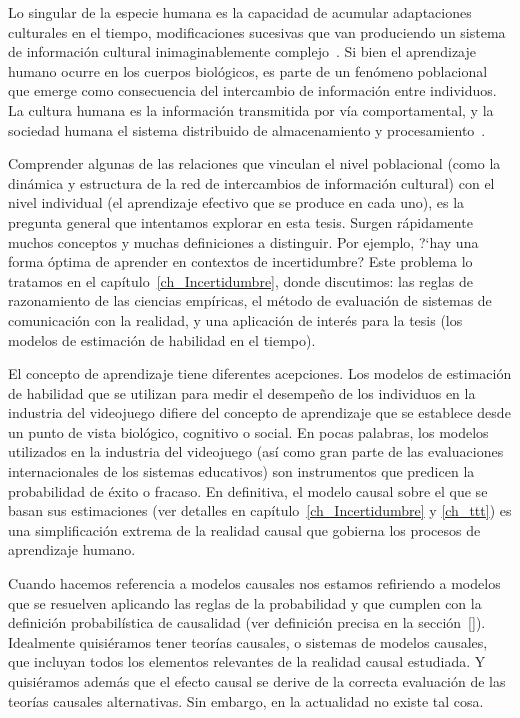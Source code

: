 \documentclass[a4paper,11pt]{book}
\theoremstyle{definition}
\begin{document}

Lo singular de la especie humana es la capacidad de acumular adaptaciones culturales en el tiempo, modificaciones sucesivas que van produciendo un sistema de informaci\'on cultural inimaginablemente complejo~\cite{Tomasello1993, Boyd2011}.
%
Si bien el aprendizaje humano ocurre en los cuerpos biol\'ogicos, es parte de un fen\'omeno poblacional que emerge como consecuencia del intercambio de informaci\'on entre individuos.
%
La cultura humana es la informaci\'on transmitida por v\'ia comportamental, y la sociedad humana el sistema distribuido de almacenamiento y procesamiento~\cite{Derex2020}.


Comprender algunas de las relaciones que vinculan el nivel poblacional (como la din\'amica y estructura de la red de intercambios de informaci\'on cultural) con el nivel individual (el aprendizaje efectivo que se produce en cada uno), es la pregunta general que intentamos explorar en esta tesis.
%
Surgen r\'apidamente muchos conceptos y muchas definiciones a distinguir.
%
Por ejemplo, ?`hay una forma \'optima de aprender en contextos de incertidumbre?
%
Este problema lo tratamos en el cap\'itulo~\ref{ch_Incertidumbre}, donde discutimos: las reglas de razonamiento de las ciencias emp\'iricas, el m\'etodo de evaluaci\'on de sistemas de comunicaci\'on con la realidad, y una aplicaci\'on de inter\'es para la tesis (los modelos de estimaci\'on de habilidad en el tiempo).


El concepto de aprendizaje tiene diferentes acepciones.
Los modelos de estimaci\'on de habilidad que se utilizan para medir el desempe\~no de los individuos en la industria del videojuego difiere del concepto de aprendizaje que se establece desde un punto de vista biol\'ogico, cognitivo o social.
%
En pocas palabras, los modelos utilizados en la industria del videojuego (as\'i como gran parte de las evaluaciones internacionales de los sistemas educativos) son instrumentos que predicen la probabilidad de \'exito o fracaso.
%
En definitiva, el modelo causal sobre el que se basan sus estimaciones (ver detalles en cap\'itulo~\ref{ch_Incertidumbre} y \ref{ch_ttt}) es una simplificaci\'on extrema de la realidad causal que gobierna los procesos de aprendizaje humano.


Cuando hacemos referencia a modelos causales nos estamos refiriendo a modelos que se resuelven aplicando las reglas de la probabilidad y que cumplen con la definici\'on probabil\'istica de causalidad (ver definici\'on precisa en la secci\'on~\ref{}).
%
Idealmente quisi\'eramos tener teor\'ias causales, o sistemas de modelos causales, que incluyan todos los elementos relevantes de la realidad causal estudiada.
%
Y quisi\'eramos adem\'as que el efecto causal se derive de la correcta evaluaci\'on de las teor\'ias causales alternativas.
%
Sin embargo, en la actualidad no existe tal cosa.
\end{document}
